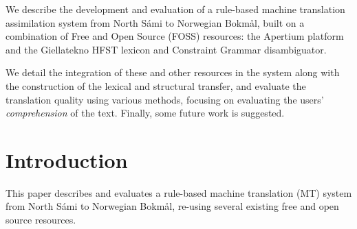 \newcommand{\comment}[1]{\textbf{TODO:~#1}}
\renewcommand{\comment}[1]{} %


\newcommand{\href}[2]{{\tt #1}} %

\newcommand{\sme}{{\tt sme}}
\newcommand{\nob}{{\tt nob}}
\newcommand{\smenob}{\sme$\rightarrow{}$\nob}
\newcommand{\nobsme}{\nob$\rightarrow{}$\sme}






  
We describe the development and evaluation of a rule-based machine
translation assimilation system from North S\'{a}mi to Norwegian Bokm{\aa}l,
built on a combination of Free and Open Source (FOSS) resources: the
Apertium platform and the Giellatekno HFST lexicon and Constraint
Grammar disambiguator. 

We detail the integration of these and other resources in the system
along with the construction of the lexical and structural transfer,
and evaluate the translation quality using various methods, focusing
on evaluating the users' \textit{comprehension} of the text. Finally,
some future work is suggested.




\section{Introduction} %
This paper describes and evaluates a rule-based machine translation
(MT) system from North S\'{a}mi to Norwegian Bokm{\aa}l, re-using
several existing free and open source resources. 

